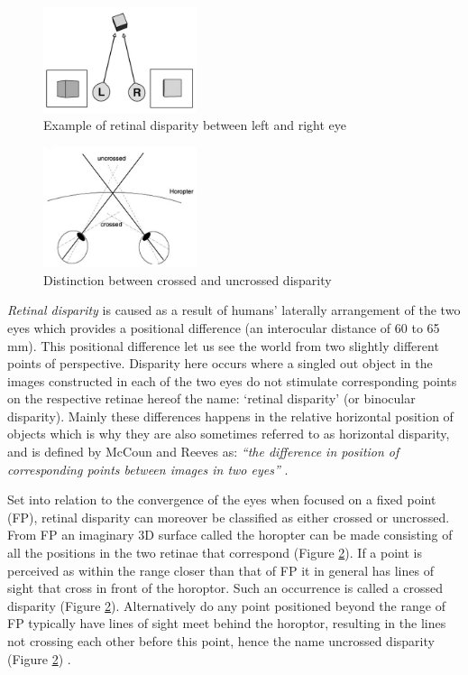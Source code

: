 \begin{figure}[h!]
   \centering
   \includegraphics[width=0.4\textwidth]{figures/cue11.jpg}
   \caption{Example of retinal disparity between  left and right eye \cite{Retina}}\label{fig:cue11}
\end{figure}

\begin{figure}[h!]
   \centering
   \includegraphics[width=0.4\textwidth]{figures/cue12.jpg}
   \caption{Distinction between crossed and uncrossed disparity \cite{Heeger}}\label{fig:cue12}
\end{figure}

\textit{Retinal disparity} is caused as a result of humans’ laterally arrangement of the two eyes which provides a positional difference (an interocular distance of 60 to 65 mm). This positional difference let us see the world from two slightly different points of perspective. Disparity here occurs where a singled out object in the images constructed in each of the two eyes do not stimulate corresponding points on the respective retinae hereof the name: ‘retinal disparity’ (or binocular disparity).  Mainly these differences happens in the relative horizontal position of objects which is why they are also sometimes referred to as horizontal disparity, and is defined by McCoun and Reeves as: \textit{“the difference in position of corresponding points between images in two eyes”} \cite{McCoun2010}.

Set into relation to the convergence of the eyes when focused on a fixed point (FP), retinal disparity can moreover be classified as either crossed or uncrossed. From FP an imaginary 3D surface called the horopter can be made consisting of all the positions in the two retinae that correspond (Figure \ref{fig:cue12}). If a point is perceived as within the range closer than that of FP it in general has lines of sight that cross in front of the horoptor. Such an occurrence is called a crossed disparity (Figure \ref{fig:cue12}). Alternatively do any point positioned beyond the range of FP typically have lines of sight meet behind the horoptor, resulting in the lines not crossing each other before this point, hence the name uncrossed disparity (Figure \ref{fig:cue12}) \cite{McCoun2010}.

